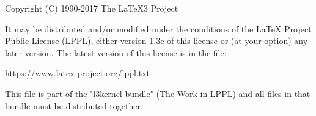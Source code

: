 


\def\MetaPrefix{--}
\preamble

Copyright (C) 1990-2017 The LaTeX3 Project

It may be distributed and/or modified under the conditions of
the LaTeX Project Public License (LPPL), either version 1.3c of
this license or (at your option) any later version.  The latest
version of this license is in the file:

   https://www.latex-project.org/lppl.txt

This file is part of the "l3kernel bundle" (The Work in LPPL)
and all files in that bundle must be distributed together.

\endpreamble
\nopostamble

\endbatchfile